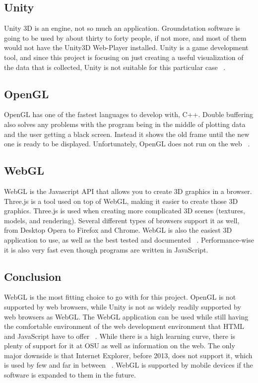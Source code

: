 \documentclass[10pt,draftclsnofoot,onecolumn]{IEEEtran}
\begin{document}
	\subsection{Unity}
	Unity 3D is an engine, not so much an application. 
	Groundstation software is going to be used by about thirty to forty people, if not more, and most of them would not have the
	Unity3D Web-Player installed. 
	Unity is a game development tool, and since this project is focusing on just creating a useful visualization of the 
	data that is collected, Unity is not suitable for this particular case ~\cite{unity}.
	
	\subsection{OpenGL}
	OpenGL has one of the fastest languages to develop with, C++. 
	Double buffering also solves any problems with the program being in the middle of plotting data and the user getting
	a black screen. 
	Instead it shows the old frame until the new one is ready to be displayed. 
	Unfortunately, OpenGL does not run on the web ~\cite{why-you-should-use-webgl}.
	
	\subsection{WebGL}
	WebGL is the Javascript API that allows you to create 3D graphics in a browser. 
	Three.js is a tool used on top of WebGL, making it easier to create those 3D graphics. 
	Three.js is used when creating more complicated 3D scenes (textures, models, and rendering). 
	Several different types of browsers support it as well, from Desktop Opera to Firefox and Chrome. 
	WebGL is also the easiest 3D application to use, as well as the best tested and documented ~\cite{webgl-best-practices}. 
	Performance-wise it is also very fast even though programs are written in JavaScript. 
	
	\subsection{Conclusion}
	WebGL is the most fitting choice to go with for this project.
	OpenGL is not supported by web browsers, while Unity is not as widely readily supported by web browsers as WebGL.
	The WebGL application can be used while still having the comfortable environment of the web development
	environment that HTML and JavaScript have to offer ~\cite{why-use-webgl-for-graphics-research}. 
	While there is a high learning curve, there is plenty of support for it at OSU as well as information on the web.
	The only major downside is that Internet Explorer, before 2013, does not support it, which is used by few and 
	far in between ~\cite{internet-ex}. 
	WebGL is supported by mobile devices if the software is expanded to them in the future.
	
\end{document}
